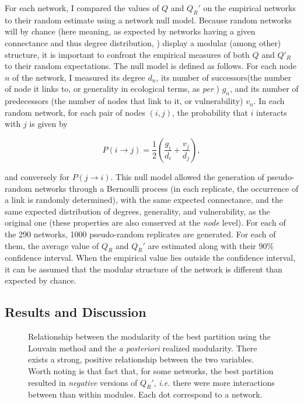 \documentclass[12pt,oneside]{article}
\begin{document}
For each network, I compared the values of $Q$ and $Q_R'$ on the empirical
networks to their random estimate using a network null model. Because random
networks will by chance (here meaning, as expected by networks having a
given connectance and thus degree distribution, \textcite{poisot_when_2013})
display a modular (among other) structure, it is important to confront the
empirical measures of both $Q$ and $Q'_R$ to their random expectations. The
null model is defined as follows. For each node $n$ of the network, I measured
its degree $d_n$, its number of successors(the number of node it links to,
or generality in ecological terms, as \emph{per} \cite{schoener_food_1989})
$g_n$, and its number of predecessors (the number of nodes that link to it,
or vulnerability) $v_n$. In each random network, for each pair of nodes
$(i,j)$, the probability that $i$ interacts with $j$ is given by

\begin{equation}
P(i\rightarrow j) = \frac{1}{2}\left(\frac{g_i}{d_i}+\frac{v_j}{d_j}\right),
\label{e:null}
\end{equation}

\noindent and conversely for $P(j \rightarrow i)$. This null model allowed
the generation of pseudo-random networks through a Bernoulli process (in
each replicate, the occurrence of a link is randomly determined), with the
same expected connectance, and the same expected distribution of degrees,
generality, and vulnerability, as the original one (these properties are
also conserved at the \emph{node} level).  For each of the 290 networks,
1000 pseudo-random replicates are generated. For each of them, the average
value of $Q_R$ and $Q_R'$ are estimated along with their 90\% confidence
interval. When the empirical value lies outside the confidence interval,
it can be assumed that the modular structure of the network is different
than expected by chance.

\subsection{Results and Discussion}

\begin{figure}[tbp]
\begin{center}
\end{center}
\caption{Relationship between the modularity of the best partition using the Louvain method and the \emph{a posteriori} realized modularity. There exists a strong, positive relationship between the two variables. Worth noting is that fact that, for some networks, the best partition resulted in \emph{negative} versions of $Q_R'$, \emph{i.e.} there were more interactions between than within modules. Each dot correspond to a network.}
\label{f:qqr}
\end{figure}
\end{document}

